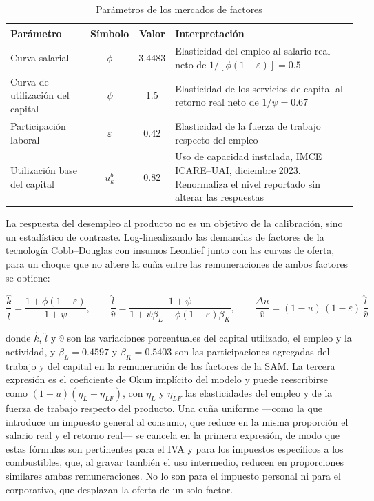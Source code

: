 \documentclass[11pt]{article}
\begin{document}
\begin{table}[H]
\centering
\caption{Parámetros de los mercados de factores}
\label{tab:calib-factores}
\small
\begin{tabular}{|l|c|c|p{7.2cm}|}
  \hline
  Parámetro & Símbolo & Valor & Interpretación \\
  \hline
  Curva salarial & $\phi$ & 3.4483 & Elasticidad del empleo al salario real neto de $1/[\phi(1-\varepsilon)]=0.5$ \\
  \hline
  Curva de utilización del capital & $\psi$ & 1.5 & Elasticidad de los servicios de capital al retorno real neto de $1/\psi=0.67$ \\
  \hline
  Participación laboral & $\varepsilon$ & 0.42 & Elasticidad de la fuerza de trabajo respecto del empleo \\
  \hline
  Utilización base del capital & $u_{k}^{b}$ & 0.82 & Uso de capacidad instalada, IMCE ICARE--UAI, diciembre 2023. Renormaliza el nivel reportado sin alterar las respuestas \\
  \hline
\end{tabular}
\end{table}

La respuesta del desempleo al producto no es un objetivo de la calibración, sino un estadístico de contraste. Log-linealizando las demandas de factores de la tecnología Cobb--Douglas con insumos Leontief junto con las curvas de oferta, para un choque que no altere la cuña entre las remuneraciones de ambos factores se obtiene:

\[
\frac{\hat{k}}{\hat{l}}=\frac{1+\phi(1-\varepsilon)}{1+\psi},
\qquad
\frac{\hat{l}}{\hat{v}}=\frac{1+\psi}{1+\psi\beta_{L}+\phi(1-\varepsilon)\beta_{K}},
\qquad
\frac{\Delta u}{\hat{v}}=(1-u)\,(1-\varepsilon)\,\frac{\hat{l}}{\hat{v}}
\]

donde $\hat{k}$, $\hat{l}$ y $\hat{v}$ son las variaciones porcentuales del capital utilizado, el empleo y la actividad, y $\beta_{L}=0.4597$ y $\beta_{K}=0.5403$ son las participaciones agregadas del trabajo y del capital en la remuneración de los factores de la SAM. La tercera expresión es el coeficiente de Okun implícito del modelo \cite{okun_1962} y puede reescribirse como $(1-u)(\eta_{L}-\eta_{LF})$, con $\eta_{L}$ y $\eta_{LF}$ las elasticidades del empleo y de la fuerza de trabajo respecto del producto. Una cuña uniforme ---como la que introduce un impuesto general al consumo, que reduce en la misma proporción el salario real y el retorno real--- se cancela en la primera expresión, de modo que estas fórmulas son pertinentes para el IVA y para los impuestos específicos a los combustibles, que, al gravar también el uso intermedio, reducen en proporciones similares ambas remuneraciones. No lo son para el impuesto personal ni para el corporativo, que desplazan la oferta de un solo factor.
\end{document}
